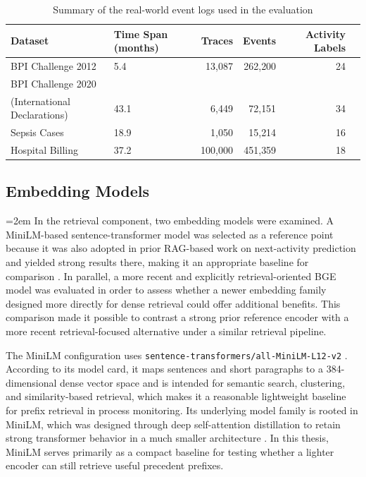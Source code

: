 \begin{table}[t]
\centering
\caption{Summary of the real-world event logs used in the evaluation}
\label{tab:dataset-summary}
\small
\setlength{\tabcolsep}{5pt}
\begin{tabular}{p{3.8cm}p{3.2cm}rrrr}
\toprule
Dataset & Time Span (months) & Traces & Events & Activity Labels \\
\midrule
BPI Challenge 2012 & 5.4 & 13{,}087 & 262{,}200 & 24 \\
BPI Challenge 2020\\(International Declarations) & 43.1 & 6{,}449 & 72{,}151 & 34 \\
Sepsis Cases & 18.9 & 1{,}050 & 15{,}214 & 16 \\
Hospital Billing & 37.2 & 100{,}000 & 451{,}359 & 18 \\
\bottomrule
\end{tabular}
\end{table}

\subsection{Embedding Models}
\begingroup
\emergencystretch=2em
In the retrieval component, two embedding models were examined. A MiniLM-based sentence-transformer model was selected as a reference point because it was also adopted in prior RAG-based work on next-activity prediction and yielded strong results there, making it an appropriate baseline for comparison \cite{casciani2026rag}. In parallel, a more recent and explicitly retrieval-oriented BGE model was evaluated in order to assess whether a newer embedding family designed more directly for dense retrieval could offer additional benefits. This comparison made it possible to contrast a strong prior reference encoder with a more recent retrieval-focused alternative under a similar retrieval pipeline.

The MiniLM configuration uses \texttt{sentence-transformers/all-MiniLM-L12-v2} \cite{minilmhf}. According to its model card, it maps sentences and short paragraphs to a 384-dimensional dense vector space and is intended for semantic search, clustering, and similarity-based retrieval, which makes it a reasonable lightweight baseline for prefix retrieval in process monitoring. Its underlying model family is rooted in MiniLM, which was designed through deep self-attention distillation to retain strong transformer behavior in a much smaller architecture \cite{minilmpaper}. In this thesis, MiniLM serves primarily as a compact baseline for testing whether a lighter encoder can still retrieve useful precedent prefixes.


